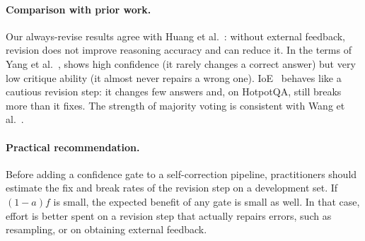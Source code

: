 \paragraph{Comparison with prior work.} Our always-revise results agree with Huang et al.~\cite{huang2024cannot}: without external feedback, revision does not improve reasoning accuracy and can reduce it. In the terms of Yang et al.~\cite{yang2024confidence}, \modelA{} shows high confidence (it rarely changes a correct answer) but very low critique ability (it almost never repairs a wrong one). IoE~\cite{li2024confidence} behaves like a cautious revision step: it changes few answers and, on HotpotQA, still breaks more than it fixes. The strength of majority voting is consistent with Wang et al.~\cite{wang2023selfconsistency}.

\paragraph{Practical recommendation.} Before adding a confidence gate to a self-correction pipeline, practitioners should estimate the fix and break rates of the revision step on a development set. If $(1-a)f$ is small, the expected benefit of any gate is small as well. In that case, effort is better spent on a revision step that actually repairs errors, such as resampling, or on obtaining external feedback.
